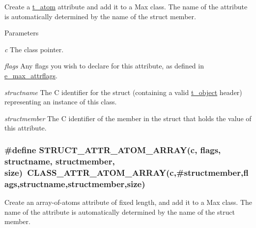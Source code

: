 Create a \hyperlink{structt__atom}{t\_\-atom} attribute and add it to a Max class. The name of the attribute is automatically determined by the name of the struct member.


\begin{DoxyParams}{Parameters}
\item[{\em c}]The class pointer. \item[{\em flags}]Any flags you wish to declare for this attribute, as defined in \hyperlink{group__attr_gaf296cfc6741bb19207f6ed8062809115}{e\_\-max\_\-attrflags}. \item[{\em structname}]The C identifier for the struct (containing a valid \hyperlink{structt__object}{t\_\-object} header) representing an instance of this class. \item[{\em structmember}]The C identifier of the member in the struct that holds the value of this attribute. \end{DoxyParams}
\hypertarget{group__attr_ga6234cc2c35f969885f4e396eab192ba6}{
\subsubsection[{STRUCT\_\-ATTR\_\-ATOM\_\-ARRAY}]{\setlength{\rightskip}{0pt plus 5cm}\#define STRUCT\_\-ATTR\_\-ATOM\_\-ARRAY(c, \/  flags, \/  structname, \/  structmember, \/  size)~CLASS\_\-ATTR\_\-ATOM\_\-ARRAY(c,\#structmember,flags,structname,structmember,size)}}
\label{group__attr_ga6234cc2c35f969885f4e396eab192ba6}


Create an array-\/of-\/atoms attribute of fixed length, and add it to a Max class. The name of the attribute is automatically determined by the name of the struct member.


